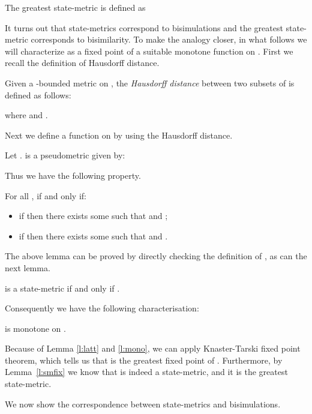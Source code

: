 \documentclass{article}
\def\squareforqed{\hbox{\rlap{}}}
\def\qed{\ifmmode\squareforqed\else{\unskip\nobreak\hfil
\penalty50\hskip1em\null\nobreak\hfil\squareforqed
\parfillskip=0pt\finalhyphendemerits=0\endgraf}\fi}
\begin{document}
The greatest state-metric is defined as


It turns out that state-metrics correspond to bisimulations and the
greatest state-metric corresponds to bisimilarity. To make the
analogy closer, in what follows we will characterize 
as a fixed point of a suitable monotone function on . First we
recall the definition of Hausdorff distance.
\begin{definition}
Given a -bounded metric  on , the {\em Hausdorff distance}
between two subsets  of  is defined as follows:

where  and .
\end{definition}
Next we define a function  on  by using the Hausdorff
distance.

\begin{definition}
Let .  is a
pseudometric given by:

\end{definition}

Thus we have the following property.

\begin{lemma}
For all ,  if and only if:
\begin{itemize}
\item if  then there exists some  such that
   and ;
\item if  then there exists some  such that
   and . \hfill\qed
\end{itemize}

\end{lemma}

The above lemma can be proved by directly checking the definition of
, as can the next lemma.
\begin{lemma}\label{l:smfix}
 is a state-metric if and only if . \hfill\qed
\end{lemma}
Consequently we have the following characterisation:


\begin{lemma}\label{l:mono}
 is monotone on . \hfill\qed
\end{lemma}

Because of Lemma \ref{l:latt} and \ref{l:mono}, we can apply
Knaster-Tarski fixed point theorem, which tells us that  is the greatest fixed point of . Furthermore, by
Lemma~\ref{l:smfix} we know that  is indeed a
state-metric, and it is the greatest state-metric.


We now show the correspondence between state-metrics and
bisimulations.
\end{document}

